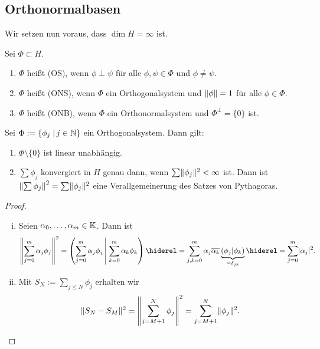 \subsection*{Orthonormalbasen}

Wir setzen nun voraus, dass $\dim H=\infty$ ist.

\begin{defi}
  Sei $\Phi\subset H$.
  \begin{enumerate}[\rm(i)]
  \item $\Phi$ heißt  (OS), wenn $\phi\perp\psi$ für alle $\phi,\psi\in\Phi$ und $\phi\neq\psi$.
  \item $\Phi$ heißt  (ONS), wenn $\Phi$ ein Orthogonalsystem und $\lVert \phi\rVert=1$ für alle $\phi\in\Phi$.
  \item $\Phi$ heißt  (ONB), wenn $\Phi$ ein Orthonormalsystem und $\Phi^\perp=\{0\}$ ist.
  \end{enumerate}
\end{defi}

\begin{lemma}
  \label{lemma:7.11} Sei $\Phi:=\{\phi_j\;\vert\, j\in\mathbb{N}\}$ ein Orthogonalsystem. Dann gilt:
  \begin{enumerate}[\rm(i)]
  \item $\Phi\setminus\{0\}$ ist linear unabhängig.
  \item $\sum\phi_j$ konvergiert in $H$ genau dann, wenn $\sum\lVert \phi_j\rVert^2<\infty$ ist. Dann ist $\left\lVert \sum\phi_j\right\rVert^2=\sum\lVert \phi_j\rVert^2$ eine Verallgemeinerung des Satzes von Pythagoras. 
  \end{enumerate}
\end{lemma}

\begin{proof}
  \begin{enumerate}[(i)]
  \item Seien $\alpha_0,\ldots,\alpha_m\in\mathbb{K}$. Dann ist
    \begin{dmath*}
      \Norm{\sum_{j=0}^m\alpha_j\phi_j}^2=\left(
        \sum_{j=0}^m\alpha_j\phi_j\;\vrule\;\sum_{k=0}^m\alpha_k\phi_k
      \right)
      \hiderel=\sum_{j,k=0}^m\alpha_j\overline{\alpha_k}\underbrace{(\phi_j\vert \phi_k)}_{=\delta_{jk}}
      \hiderel=\sum_{j=0}^m\abs{\alpha_j}^2.
    \end{dmath*}
  \item Mit $S_N:=\sum_{j\leq N}\phi_j$ erhalten wir
    \[ \lVert S_N-S_M\rVert^2=\left\lVert \sum_{j=M+1}^N\phi_j\right\rVert^2=\sum_{j=M+1}^N\lVert \phi_j\rVert^2. \]
  \end{enumerate}
\end{proof}

